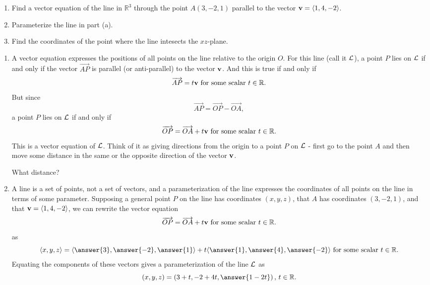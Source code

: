 \documentclass{ximera}
\begin{document}
\begin{example} \label{Ex3434523093}
\begin{enumerate}
\item Find a vector equation of the line in $\mathbb{R}^3$ through the point $A(3,-2,1)$ parallel to the vector ${\bf v}  =\langle 1,4,-2\rangle$.

\item Parameterize the line in part (a).

\item Find the coordinates of the point where the line intesects the $xz$-plane.

\end{enumerate}

\begin{explanation}
\begin{enumerate}
\item A vector equation expresses the positions of all points on the line relative to the origin $O$. For this line (call it ${\cal L}$), a point $P$ lies on ${\cal L}$ if and only if the vector $\overrightarrow{AP}$ is parallel (or anti-parallel) to the vector ${\bf v}$. And this is true if and only if
\[
       \overrightarrow{AP} = t {\bf v} \text{ for some scalar } t\in \mathbb{R} .
\]
But since
\[
    \overrightarrow{AP} = \overrightarrow{OP} - \overrightarrow{OA} ,
\]
a point $P$ lies on ${\cal L}$ if and only if
\[
    \overrightarrow{OP} = \overrightarrow{OA} + t {\bf v} \text{ for some scalar } t\in \mathbb{R}.
\]
This is a vector equation of ${\cal L}$. Think of it as giving directions from the origin to a point $P$ on ${\cal L}$ - first go to the point $A$ and then move some distance in the same or the opposite direction of the vector ${\bf v}$.

What distance?
\begin{multipleChoice}
\end{multipleChoice}

\item A line is a set of points, not a set of vectors, and a parameterization of the line expresses the coordinates of all points on the line in terms of some parameter. Supposing a general point $P$ on the line has coordinates $(x,y,z)$, that $A$ has coordinates $(3,-2,1)$, and that ${\bf v} = \langle 1,4,-2\rangle$, we can rewrite the vector equation
\[
    \overrightarrow{OP} = \overrightarrow{OA} + t {\bf v} \text{ for some scalar } t\in \mathbb{R}.
\]
as
\[
    \langle x, y, z \rangle = \langle \answer{3}, \answer{-2}, \answer{1} \rangle + t \langle \answer{1}, \answer{4}, \answer{-2} \rangle \text{ for some scalar } t\in \mathbb{R}.
\]
Equating the components of these vectors gives a parameterization of the line ${\cal L}$ as 
\[
   (x,y,z) = (3+t , -2 + 4t, \answer{1-2t}) \, , \, t\in \mathbb{R} .
\]


\end{enumerate}
\end{explanation}
\end{example}
\end{document}
